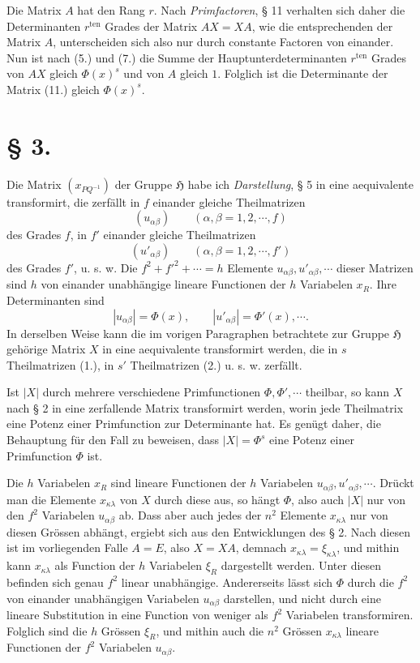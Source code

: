 \documentclass[11pt]{article}
\newcommand{\Hgr}{\mathfrak{H}}
\newcommand{\ten}{\mathrm{ten}}
\begin{document}
Die Matrix $A$ hat den Rang $r$. Nach \emph{Primfactoren}, § 11 verhalten sich daher die Determinanten $r^{\ten}$ Grades der Matrix $AX=XA$, wie die entsprechenden der Matrix $A$, unterscheiden sich also nur durch constante Factoren von einander. Nun ist nach (5.) und (7.) die Summe der Hauptunterdeterminanten $r^{\ten}$ Grades von $AX$ gleich $\Phi(x)^s$ und von $A$ gleich $1$. Folglich ist die Determinante der Matrix (11.) gleich $\Phi(x)^s$.

\section*{§ 3.}

Die Matrix $(x_{PQ^{-1}})$ der Gruppe $\Hgr$ habe ich \emph{Darstellung}, § 5 in eine aequivalente transformirt, die zerfällt in $f$ einander gleiche Theilmatrizen
\begin{equation}\tag{1.}
(u_{\alpha\beta})\qquad(\alpha,\beta=1,2,\cdots,f)
\end{equation}
des Grades $f$, in $f'$ einander gleiche Theilmatrizen
\begin{equation}\tag{2.}
(u'_{\alpha\beta})\qquad(\alpha,\beta=1,2,\cdots,f')
\end{equation}
des Grades $f'$, u. s. w. Die $f^2+f'^2+\cdots=h$ Elemente $u_{\alpha\beta},u'_{\alpha\beta},\cdots$ dieser Matrizen sind $h$ von einander unabhängige lineare Functionen der $h$ Variabelen $x_R$. Ihre Determinanten sind
\[
|u_{\alpha\beta}|=\Phi(x),\qquad |u'_{\alpha\beta}|=\Phi'(x),\cdots.
\]
In derselben Weise kann die im vorigen Paragraphen betrachtete zur Gruppe $\Hgr$ gehörige Matrix $X$ in eine aequivalente transformirt werden, die in $s$ Theilmatrizen (1.), in $s'$ Theilmatrizen (2.) u. s. w. zerfällt.

Ist $|X|$ durch mehrere verschiedene Primfunctionen $\Phi,\Phi',\cdots$ theilbar, so kann $X$ nach § 2 in eine zerfallende Matrix transformirt werden, worin jede Theilmatrix eine Potenz einer Primfunction zur Determinante hat. Es genügt daher, die Behauptung für den Fall zu beweisen, dass $|X|=\Phi^s$ eine Potenz einer Primfunction $\Phi$ ist.

Die $h$ Variabelen $x_R$ sind lineare Functionen der $h$ Variabelen $u_{\alpha\beta},u'_{\alpha\beta},\cdots$. Drückt man die Elemente $x_{\kappa\lambda}$ von $X$ durch diese aus, so hängt $\Phi$, also auch $|X|$ nur von den $f^2$ Variabelen $u_{\alpha\beta}$ ab. Dass aber auch jedes der $n^2$ Elemente $x_{\kappa\lambda}$ nur von diesen Grössen abhängt, ergiebt sich aus den Entwicklungen des § 2. Nach diesen ist im vorliegenden Falle $A=E$, also $X=XA$, demnach $x_{\kappa\lambda}=\xi_{\kappa\lambda}$, und mithin kann $x_{\kappa\lambda}$ als Function der $h$ Variabelen $\xi_R$ dargestellt werden. Unter diesen befinden sich genau $f^2$ linear unabhängige. Andererseits lässt sich $\Phi$ durch die $f^2$ von einander unabhängigen Variabelen $u_{\alpha\beta}$ darstellen, und nicht durch eine lineare Substitution in eine Function von weniger als $f^2$ Variabelen transformiren. Folglich sind die $h$ Grössen $\xi_R$, und mithin auch die $n^2$ Grössen $x_{\kappa\lambda}$ lineare Functionen der $f^2$ Variabelen $u_{\alpha\beta}$.
\end{document}

